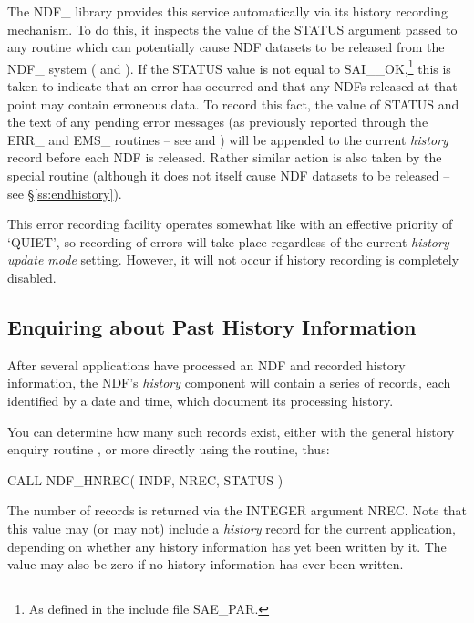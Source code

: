 \documentclass[twoside,11pt,nolof]{starlink}
\providecommand{\st}[1]{{\emph{#1}}}
\begin{document}
The NDF\_ library provides this service automatically via its history
recording mechanism. To do this, it inspects the value of the STATUS
argument passed to any routine which can potentially cause NDF
datasets to be released from the NDF\_ system ( and
).  If the STATUS value is not equal to SAI\_\_OK,\footnote{As
defined in the include file SAE\_PAR.} this is taken to indicate that
an error has occurred and that any NDFs released at that point may
contain erroneous data. To record this fact, the value of STATUS and
the text of any pending error messages (as previously reported through
the ERR\_ and EMS\_ routines -- see  and
) will be appended to the current \st{history\/}
record before
each NDF is released.  Rather similar action is also taken by the
special routine  (although it does not itself cause NDF
datasets to be released -- see \S\ref{ss:endhistory}).

This error recording facility operates somewhat like  with an
effective priority of `QUIET', so recording of errors will take place
regardless of the current \st{history update mode\/} setting.  However,
it will not occur if history recording is completely disabled.

\subsection{Enquiring about Past History Information}

After several applications have processed an NDF and recorded history
information, the NDF's \st{history\/} component will contain a series of
records, each identified by a date and time, which document its
processing history.

You can determine how many such records exist, either with the general
history enquiry routine , or more directly using the
 routine, thus:

\small
\begin{terminalv}
      CALL NDF_HNREC( INDF, NREC, STATUS )
\end{terminalv}
\normalsize

The number of records is returned via the INTEGER argument NREC. Note
that this value may (or may not) include a \st{history\/} record for
the current application, depending on whether any history information
has yet been written by it. The value may also be zero if no history
information has ever been written.
\end{document}
